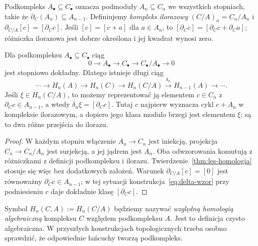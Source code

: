 Podkompleks $A_\bullet\subseteq C_\bullet$
oznacza podmoduły $A_n\subseteq C_n$
we wszystkich stopniach, takie że
$\partial_C(A_n)\subseteq A_{n-1}$.
Definiujemy \emph{kompleks ilorazowy}
$(C/A)_n=C_n/A_n$ i
$\partial_{C/A}[c]=[\partial_Cc]$.
Jeśli $[c]=[c+a]$ dla $a\in A_n$,
to $[\partial_Cc]=[\partial_Cc+\partial_Ca]$;
różniczka ilorazowa jest dobrze
określona i jej kwadrat wynosi zero.

\begin{stwierdzenie}
\label{prop:ses-iloraz}
Dla podkompleksu $A_\bullet\subseteq C_\bullet$
ciąg
\[
 0\longrightarrow A_\bullet
 \longrightarrow C_\bullet
 \longrightarrow C_\bullet/A_\bullet
 \longrightarrow0
\]
jest stopniowo dokładny. Dlatego istnieje
długi ciąg
\begin{equation}\label{eq:les-iloraz}
 \cdots\to H_n(A)\to H_n(C)\to H_n(C/A)
 \xrightarrow{\delta_n}H_{n-1}(A)\to\cdots.
\end{equation}
Jeśli $\xi\in H_n(C/A)$, to możemy
reprezentować ją elementem $c\in C_n$
z $\partial_Cc\in A_{n-1}$, a wtedy
$\delta_n\xi=[\partial_Cc]$. Tutaj $c$ najpierw wyznacza cykl
$c+A_n$ w kompleksie ilorazowym, a dopiero jego klasa modulo
brzegi jest elementem $\xi$; są to dwa różne przejścia do ilorazu.
\end{stwierdzenie}
\begin{proof}
W każdym stopniu włączenie $A_n\to C_n$
jest iniekcją, projekcja $C_n\to C_n/A_n$
jest surjekcją, a jej jądrem jest $A_n$.
Oba odwzorowania komutują z różniczkami
z definicji podkompleksu i ilorazu.
Twierdzenie~\ref{thm:les-homologia}
stosuje się więc bez dodatkowych
założeń. Warunek
$\partial_{C/A}[c]=[0]$ jest równoważny
$\partial_Cc\in A_{n-1}$; w tej sytuacji
konstrukcja~\eqref{eq:delta-wzor}
przy podniesieniu $c$ daje dokładnie
klasę $[\partial_Cc]$.
\end{proof}

Symbol $H_n(C,A):=H_n(C/A)$ będziemy
nazywać \emph{względną homologią
algebraiczną} kompleksu $C$ względem
podkompleksu $A$. Jest to definicja
czysto algebraiczna. W przyszłych
konstrukcjach topologicznych trzeba
osobno sprawdzić, że odpowiednie
łańcuchy tworzą podkompleks.

